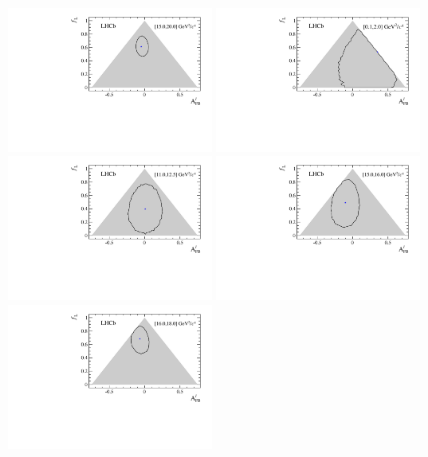 \begin{figure}[h]
\centering
\includegraphics[width=0.48\textwidth]{Lmumu/figs/paper/figure9.pdf}
\includegraphics[width=0.48\textwidth]{Lmumu/figs/paper/figure10a.pdf}
\includegraphics[width=0.48\textwidth]{Lmumu/figs/paper/figure10b.pdf}
\includegraphics[width=0.48\textwidth]{Lmumu/figs/paper/figure10c.pdf}
\includegraphics[width=0.48\textwidth]{Lmumu/figs/paper/figure10d.pdf}

\end{figure}
